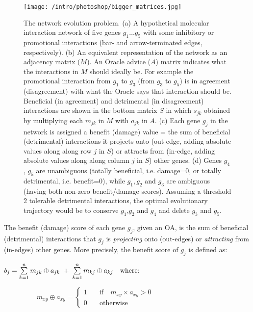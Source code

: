  \begin{figure*}[h]
		\centering
		\texttt{[image: /intro/photoshop/bigger\_matrices.jpg]} %
		\caption{The network evolution problem. (a) A hypothetical  molecular interaction network of five genes $g_1 \dots g_5$ with 
		some inhibitory or promotional interactions (bar- and arrow-terminated edges, respectively). 
		(b) An equivalent representation of the network as an adjacency matrix ($M$). An Oracle advice ($A$) matrix indicates what the interactions in $M$ should 
		ideally be. 
		For example the promotional interaction from $g_1$ to $g_3$ (from $g_3$ to $g_5$) is in agreement (disagreement) with what the 
		Oracle says that interaction should be. Beneficial (in agreement) and detrimental (in disagreement) interactions are 
		shown in the bottom matrix $S$ in which $s_{jk}$ obtained by multiplying each $m_{jk}$ in $M$ with $a_{jk}$ in $A$. (c) Each gene $g_j$ in the network is 
		assigned a benefit (damage) value = the sum of beneficial (detrimental) interactions it projects onto 
		(out-edge, adding absolute values along along row $j$ in $S$) or attracts from (in-edge, adding absolute values along along column $j$ in $S$) other genes. 
		(d) Genes $g_4$, $g_5$ are unambiguous (totally beneficial, i.e. damage=0, or totally detrimental, i.e. benefit=0), while $g_1,g_2$ and $g_3$ 
		are ambiguous (having both non-zero benefit/damage scores). Assuming a threshold 2 tolerable detrimental interactions, the optimal evolutionary trajectory would be to conserve $g_1$,$g_2$ and $g_4$ and delete $g_3$ and $g_5$. }
\label{intro_figure}
\end{figure*}	
The benefit (damage)
score of each gene $g_j$, given an OA, is the sum of beneficial (detrimental) interactions that $g_j$ is
\textit{projecting} onto (out-edges) or \textit{attracting} from (in-edges) other genes. More precisely, the benefit score of $g_j$ is defined as:

 $b_j = \sum\limits_{k=1}^{n} m_{jk} \oplus a_{jk} \hspace{0.1cm}+\hspace{0.1cm} \sum\limits_{k=1}^{n} m_{kj} \oplus a_{kj} \quad\textrm{where:}$ 
 
 $\hspace{2cm}m_{xy} \oplus a_{xy}  =	\scriptscriptstyle{\begin{cases}	%
											1 & \quad\textrm{if}\quad m_{xy} \times a_{xy} >0 \\
											0 & \quad\textrm{otherwise} 
									\end{cases}	
									}$
 
